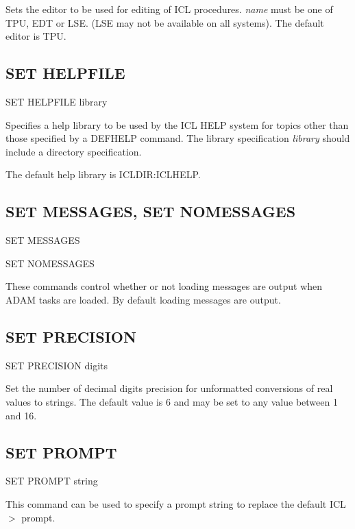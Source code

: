 \documentclass[twoside,11pt]{report}
\newcommand{\xlabel}[1]{}
\begin{document}
Sets the editor to be used for editing of ICL procedures. {\em name}
must be one of TPU, EDT or LSE. (LSE may not be available on all systems).
The default editor is TPU.

\subsection{\xlabel{SET_HELPFILE}SET HELPFILE\label{SET_HELPFILE}}

   SET HELPFILE library

Specifies a help library to be used by the ICL HELP system for topics other
than those specified by a DEFHELP command. The library specification 
{\em library} should include a directory specification.

The default help library is ICLDIR:ICLHELP.


\subsection{\xlabel{SET_MESSAGES}SET MESSAGES, SET NOMESSAGES\label{SET_MESSAGES}}

   SET MESSAGES

   SET NOMESSAGES

These commands control whether or not loading messages are output when
ADAM tasks are loaded. By default loading messages are output.

\subsection{\xlabel{SET_PRECISION}SET PRECISION\label{SET_PRECISION}}

   SET PRECISION \hspace{.5cm} digits

Set the number of decimal digits precision for unformatted conversions
of real values to strings. The default value is 6 and may be set to any 
value between 1 and 16.

\subsection{\xlabel{SET_PROMPT}SET PROMPT\label{SET_PROMPT}}

   SET PROMPT \hspace{.5cm} string

This command can be used to specify a prompt string to replace the
default ICL$>$ prompt.
                                                             
\end{document}
